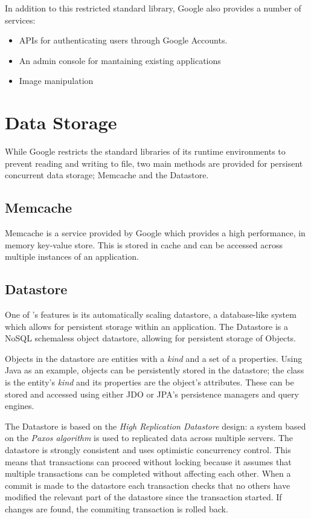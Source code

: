 In addition to this restricted standard library, Google also provides a number of services:
\begin{itemize}
\item APIs for authenticating users through Google Accounts.
\item An admin console for mantaining existing applications
\item Image manipulation
\end{itemize}

\section{Data Storage}
While Google restricts the standard libraries of its runtime environments to prevent reading and writing to file, two main methods are provided for persisent concurrent data storage; Memcache and the Datastore.

\subsection{Memcache}
Memcache is a service provided by Google which provides a high performance, in memory key-value store. This is stored in cache and can be accessed across multiple instances of an application\ftGAETwo.

\subsection{Datastore}
One of \gae{}'s features is its automatically scaling datastore, a database-like system which allows for persistent storage within an application. The Datastore is a NoSQL schemaless object datastore, allowing for persistent storage of Objects. 

Objects in the datastore are entities with a \emph{kind} and a set of a properties. Using Java as an example, objects can be persistently stored in the datastore; the class is the entity's \emph{kind} and its properties are the object's attributes. These can be stored and accessed using either JDO or JPA's persistence managers and query engines\ftGAETwo.

The Datastore is based on the \emph{High Replication Datastore} design: a system based on the \emph{Paxos algorithm} is used to replicated data across multiple servers. The datastore is strongly consistent and uses optimistic concurrency control\ftGAEThree. This means that transactions can proceed without locking because it assumes that multiple transactions can be completed without affecting each other. When a commit is made to the datastore each transaction checks that no others have modified the relevant part of the datastore since the transaction started. If changes are found, the commiting transaction is rolled back\ftGAEFour.\ftGAEThreeText\ftGAEFourText
 
